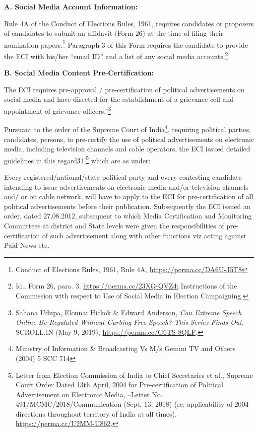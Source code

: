 \begin{multicols}{2}
\vspace{-.15cm}
\noi
{\large\bfseries A. Social Media Account Information:}

\vspace{-.15cm}
\noi
Rule 4A of the Conduct of Elections Rules, 1961, requires candidates or proposers of
candidates to submit an affidavit (Form 26) at the time of filing their nomination
papers.\footnote{Conduct of Elections Rules, 1961, Rule 4A, \url{https://perma.cc/DA6U-J5T8}} Paragraph 3 of this Form requires the candidate to provide the ECI with his/her “email ID” and a list of any social media accounts.\footnote{Id., Form 26, para. 3, \url{https://perma.cc/23XQ-QVZ4;} Instructions of the Commission with respect to Use of Social Media in Election Campaigning.}

\vspace{-.15cm}
\noi
{\large\bfseries B. Social Media Content Pre-Certification:}

\vspace{-.15cm}
\noi
The ECI requires pre-approval / pre-certification of political advertisements on social media
and have directed for the establishment of a grievance cell and appointment of grievance
officers.”\footnote{Sahana Udupa, Elonnai Hickok \& Edward Anderson, \textit{Can Extreme Speech Online Be Regulated Without
Curbing Free Speech? This Series Finds Out}, SCROLL.IN (May 9, 2019), \url{https://perma.cc/G6TS-8QLF}.}

\noi
Pursuant to the order of the Supreme Court of India\footnote{ Ministry of Information \& Broadcasting Vs M/s Gemini TV and Others (2004) 5 SCC 714}, requiring political parties, candidates,
persons, to pre-certify the use of political advertisements on electronic media, including
television channels and cable operators, the ECI issued detailed guidelines in this regard31,\footnote{Letter from Election Commission of India to Chief Secretaries et al., Supreme Court Order Dated 13th April, 2004 for Pre-certification of Political Advertisement on Electronic Media, –Letter No. 491/MCMC/2018/Communication (Sept. 13, 2018) (re: applicability of 2004 directions throughout territory of India at all times), \url{https://perma.cc/U2MM-U862}.} which are as under:

\noi
Every registered/national/state political party and every contesting candidate intending to
issue advertisements on electronic media and/or television channels and/ or on cable network,
will have to apply to the ECI for pre-certification of all political advertisements before their
publication. Subsequently the ECI issued an order, dated 27.08.2012, subsequent to which
Media Certification and Monitoring Committees at district and State levels were given the
responsibilities of pre-certification of such advertisement along with other functions viz
acting against Paid News etc.


\end{multicols}
